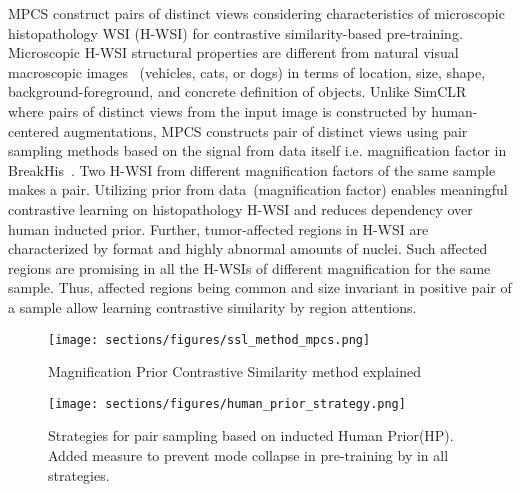 \documentclass[conference]{IEEEtran}
\begin{document}
MPCS construct pairs of distinct views considering characteristics of microscopic histopathology WSI (H-WSI) for contrastive similarity-based pre-training.
Microscopic H-WSI structural properties are different from natural visual macroscopic images~\cite{deng2009imagenet} (vehicles, cats, or dogs) in terms of location, size, shape, background-foreground, and concrete definition of objects.
Unlike SimCLR~\cite{chen2020simple} where pairs of distinct views from the input image is constructed by human-centered augmentations, MPCS constructs pair of distinct views using pair sampling methods based on the signal from data itself i.e. magnification factor in BreakHis~\cite{spanhol2016dataset}. 
Two H-WSI from different magnification factors of the same sample makes a pair. 
Utilizing prior from data~(magnification factor) enables meaningful contrastive learning on histopathology H-WSI and reduces dependency over human inducted prior.
Further, tumor-affected regions in H-WSI are characterized by format and highly abnormal amounts of nuclei. 
Such affected regions are promising in all the H-WSIs of different magnification for the same sample.
Thus, affected regions being common and size invariant in positive pair of a sample allow learning contrastive similarity by region attentions.



\begin{figure}[t]
    \centering
    \texttt{[image: sections/figures/ssl\_method\_mpcs.png]}
    \vspace{-0.2cm}
    \caption{Magnification Prior Contrastive Similarity method explained}
    \label{fig:ssl_mpcs}
    \vspace{-4mm}
\end{figure}
\begin{figure}[!ht]
    \centering
    \texttt{[image: sections/figures/human\_prior\_strategy.png]}
    \vspace{-0.2cm}
    \caption{Strategies for pair sampling based on inducted Human Prior(HP). Added measure to prevent mode collapse in pre-training by  in all strategies.}
    \label{fig:human_prior}
    \vspace{-5mm}
\end{figure}
\end{document}
